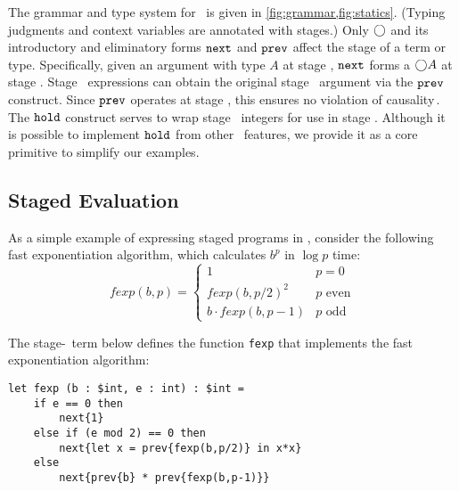 The grammar and type system for \lang\ is given in
\ref{fig:grammar,fig:statics}. (Typing judgments and context variables are annotated with stages.)
Only $\bigcirc$ and its introductory and eliminatory forms ${\tt next}$ and ${\tt prev}$ affect the stage
of a term or type.
Specifically, given an argument with type $A$ at stage \bbtwo, ${\tt next}$ forms a $\bigcirc A$ at stage \bbone.  
Stage \bbtwo\ expressions can obtain the original stage \bbtwo\ argument via the ${\tt prev}$ construct.  
Since ${\tt prev}$ operates at stage \bbtwo, this ensures no violation of causality\,\cite{cave14}.
The ${\tt hold}$ construct serves to wrap stage \bbone\ integers for use in stage \bbtwo.  
Although it is possible to implement ${\tt hold}$ from other \lang\ features, 
we provide it as a core primitive to simplify our examples. 

\subsection{Staged Evaluation}

As a simple example of expressing staged programs in \lang, consider the following fast exponentiation algorithm, which 
calculates $b^p$ in $\log p$ time:
\[
	\mathit{fexp}(b,p) = \left \{ \begin{array}{ll} 
		1 &  p = 0 \\ 
		\mathit{fexp}(b,p/2)^2 & p \text{ even} \\ 
		b \cdot \mathit{fexp}(b,p-1) & p \text{ odd} \end{array}
	\right .
\]

\noindent
The stage-\bbone\ term below defines the function {\tt fexp} that implements the fast exponentiation algorithm:%

\begin{lstlisting} 
let fexp (b : $int, e : int) : $int =
	if e == 0 then
		next{1}
	else if (e mod 2) == 0 then
		next{let x = prev{fexp(b,p/2)} in x*x}
	else
		next{prev{b} * prev{fexp(b,p-1)}}		
\end{lstlisting}

